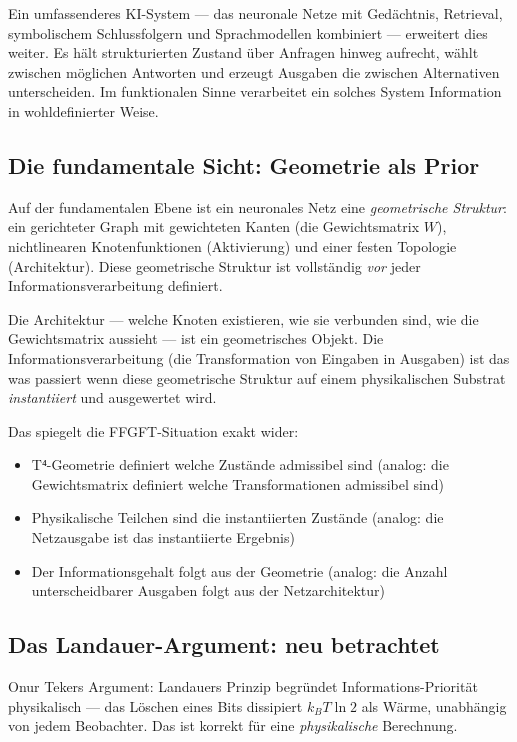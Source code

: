 Ein umfassenderes KI-System --- das neuronale Netze mit Gedächtnis,
Retrieval, symbolischem Schlussfolgern und Sprachmodellen kombiniert ---
erweitert dies weiter. Es hält strukturierten Zustand über Anfragen
hinweg aufrecht, wählt zwischen möglichen Antworten und erzeugt
Ausgaben die zwischen Alternativen unterscheiden. Im funktionalen Sinne
verarbeitet ein solches System Information in wohldefinierter Weise.

\subsection{Die fundamentale Sicht: Geometrie als Prior}

Auf der fundamentalen Ebene ist ein neuronales Netz eine
\emph{geometrische Struktur}: ein gerichteter Graph mit gewichteten
Kanten (die Gewichtsmatrix $W$), nichtlinearen Knotenfunktionen
(Aktivierung) und einer festen Topologie (Architektur). Diese
geometrische Struktur ist vollständig \emph{vor} jeder
Informationsverarbeitung definiert.

Die Architektur --- welche Knoten existieren, wie sie verbunden sind,
wie die Gewichtsmatrix aussieht --- ist ein geometrisches Objekt. Die
Informationsverarbeitung (die Transformation von Eingaben in Ausgaben)
ist das was passiert wenn diese geometrische Struktur auf einem
physikalischen Substrat \emph{instantiiert} und ausgewertet wird.

Das spiegelt die FFGFT-Situation exakt wider:
\begin{itemize}
  \item T⁴-Geometrie definiert welche Zustände admissibel sind
        (analog: die Gewichtsmatrix definiert welche Transformationen
        admissibel sind)
  \item Physikalische Teilchen sind die instantiierten Zustände
        (analog: die Netzausgabe ist das instantiierte Ergebnis)
  \item Der Informationsgehalt folgt aus der Geometrie
        (analog: die Anzahl unterscheidbarer Ausgaben folgt aus der
        Netzarchitektur)
\end{itemize}

\subsection{Das Landauer-Argument: neu betrachtet}

Onur Tekers Argument: Landauers Prinzip begründet Informations-Priorität
physikalisch --- das Löschen eines Bits dissipiert $k_B T \ln 2$ als
Wärme, unabhängig von jedem Beobachter. Das ist korrekt für eine
\emph{physikalische} Berechnung.

